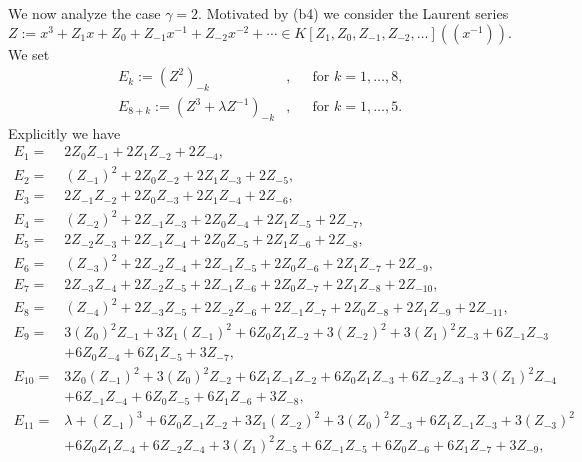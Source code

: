 \documentclass[reqno,a4paper]{amsart}
\theoremstyle{definition}
\theoremstyle{remark}
\begin{document}
We now analyze the case $\gamma=2$. Motivated by (b4) we consider the Laurent series
$$
Z := x^3+Z_1 x+Z_0+Z_{-1}x^{-1}+Z_{-2}x^{-2}+\cdots\in K[Z_1,Z_0,Z_{-1},Z_{-2},\dots]((x^{-1})).
$$
We set
\begin{equation}
\begin{aligned}
E_k:=(Z^2)_{-k} & , && \text{for $k=1,\dots, 8$,}\\
%
E_{8+k}:=\left( Z^3+\lambda Z^{-1}\right)_{-k} & , &&\text{for $k=1,\dots,5$.}
\end{aligned}
\end{equation}
Explicitly we have
\allowdisplaybreaks
\begin{align*}
E_1 =& 2 Z_ 0 Z_ {-1} + 2 Z_ 1 Z_ {-2} + 2 Z_ {-4},\\
E_2 =& (Z_ {-1})^2 + 2 Z_ 0 Z_ {-2} + 2 Z_ 1 Z_ {-3} + 2 Z_ {-5},\\
E_3 =& 2 Z_ {-1} Z_ {-2} + 2 Z_ 0 Z_ {-3} + 2 Z_ 1 Z_ {-4} + 2 Z_ {-6},\\
E_4 =& (Z_ {-2})^2 + 2 Z_ {-1} Z_ {-3} + 2 Z_ 0 Z_ {-4} +  2 Z_ 1 Z_ {-5} + 2 Z_ {-7},\\
E_5 =& 2 Z_ {-2} Z_ {-3} + 2 Z_ {-1} Z_ {-4} + 2 Z_ 0 Z_ {-5} + 2 Z_ 1 Z_ {-6} + 2 Z_ {-8},\\
E_6 =& (Z_ {-3})^2 + 2 Z_ {-2} Z_ {-4} + 2 Z_ {-1} Z_ {-5} +  2 Z_ 0 Z_ {-6} + 2 Z_ 1 Z_ {-7} + 2 Z_ {-9},\\
E_7 =&  2 Z_ {-3} Z_ {-4} + 2 Z_ {-2} Z_ {-5} +  2 Z_ {-1} Z_ {-6} + 2 Z_ 0 Z_ {-7}
+ 2 Z_ 1 Z_ {-8}+2 Z_ {-10},\\
E_8 =& (Z_ {-4})^2 + 2 Z_ {-3} Z_ {-5} + 2 Z_ {-2} Z_ {-6} + 2 Z_ {-1} Z_ {-7} + 2 Z_ 0 Z_ {-8}
+ 2 Z_ 1 Z_ {-9}+ 2 Z_ {-11},\\
E_ 9 =& 3 (Z_ 0)^2 Z_ {-1} + 3 Z_ 1 (Z_ {-1})^2 +  6 Z_ 0 Z_ 1 Z_ {-2} + 3 (Z_ {-2})^2 + 3 (Z_ 1)^2 Z_ {-3}
+ 6 Z_{-1} Z_ {-3}\\
& + 6 Z_ 0 Z_ {-4} + 6 Z_ 1 Z_ {-5} + 3 Z_ {-7},\\
E_ {10} =& 3 Z_ 0 (Z_ {-1})^2 + 3 (Z_ 0)^2 Z_ {-2} + 6 Z_ 1 Z_ {-1} Z_ {-2} + 6 Z_ 0 Z_ 1 Z_ {-3}
+ 6 Z_ {-2} Z_ {-3}+ 3 (Z_ 1)^2 Z_ {-4}\\
  &  + 6 Z_ {-1} Z_ {-4} + 6 Z_ 0 Z_ {-5} + 6 Z_ 1 Z_ {-6} + 3 Z_ {-8},\\
E_ {11} =& \lambda + (Z_ {-1})^3 + 6 Z_ 0 Z_ {-1} Z_ {-2} + 3 Z_ 1 (Z_ {-2})^2 + 3 (Z_ 0)^2 Z_ {-3}
+ 6 Z_ 1 Z_ {-1} Z_ {-3} + 3 (Z_ {-3})^2 \\
& + 6 Z_ 0 Z_ 1 Z_ {-4} + 6 Z_ {-2} Z_ {-4} +  3 (Z_ 1)^2 Z_ {-5} + 6 Z_ {-1} Z_ {-5} + 6 Z_ 0 Z_ {-6}
 +6 Z_ 1 Z_ {-7} + 3 Z_ {-9},\\

\end{align*}
\end{document}
